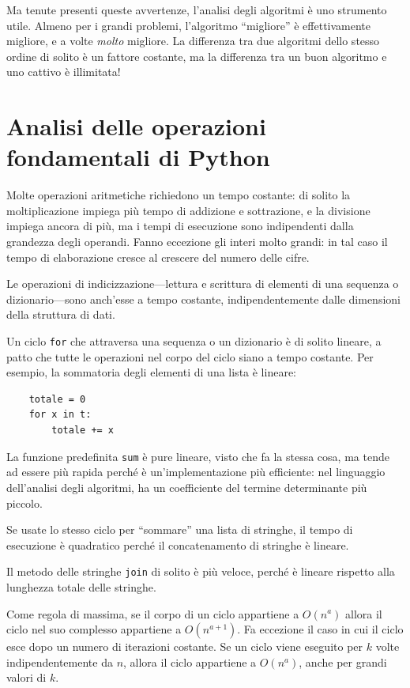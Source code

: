 \documentclass[10pt]{book}
\begin{document}
Ma tenute presenti queste avvertenze, l'analisi degli algoritmi è uno strumento utile. Almeno per i grandi problemi, l'algoritmo ``migliore'' è effettivamente migliore, e a volte {\em molto} migliore. La differenza tra due algoritmi dello stesso ordine di solito è un fattore costante, ma la differenza tra un buon algoritmo e uno cattivo è illimitata!


\section{Analisi delle operazioni fondamentali di Python}

Molte operazioni aritmetiche richiedono un tempo costante: di solito la moltiplicazione impiega più tempo di addizione e sottrazione, e la divisione impiega ancora di più, ma i tempi di esecuzione sono indipendenti dalla grandezza degli operandi. Fanno eccezione gli interi molto grandi: in tal caso il tempo di elaborazione cresce al crescere del numero delle cifre.

Le operazioni di indicizzazione---lettura e scrittura di elementi di una sequenza o dizionario---sono anch'esse a tempo costante, indipendentemente dalle dimensioni della struttura di dati.

Un ciclo {\tt for} che attraversa una sequenza o un dizionario è di solito lineare, a patto che tutte le operazioni nel corpo del ciclo siano a tempo costante. Per esempio, la sommatoria degli elementi di una lista è lineare:

\begin{verbatim}
    totale = 0
    for x in t:
        totale += x
\end{verbatim}

La funzione predefinita {\tt sum} è pure lineare, visto che fa la stessa cosa, ma tende ad essere più rapida perché è un'implementazione più efficiente: nel linguaggio dell'analisi degli algoritmi, ha un coefficiente del termine determinante più piccolo.

Se usate lo stesso ciclo per ``sommare'' una lista di stringhe, il tempo di esecuzione è quadratico perché il concatenamento di stringhe è lineare.

Il metodo delle stringhe {\tt join} di solito è più veloce, perché è lineare rispetto alla lunghezza totale delle stringhe.

Come regola di massima, se il corpo di un ciclo appartiene a $O(n^a)$ allora il ciclo nel suo complesso appartiene a $O(n^{a+1})$.  Fa eccezione il caso in cui il ciclo esce dopo un numero di iterazioni costante. Se un ciclo viene eseguito per $k$ volte indipendentemente da $n$, allora il ciclo appartiene a $O(n^a)$, anche per grandi valori di $k$.
\end{document}
